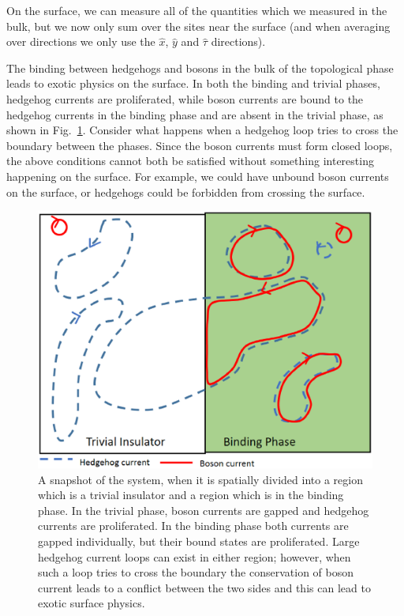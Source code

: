 \documentclass[prb,twocolumn]{revtex4-1}
\begin{document}
On the surface, we can measure all of the quantities which we measured in the bulk, but we now only sum over the sites near the surface (and when averaging over directions we only use the $\hat{x}$, $\hat{y}$ and $\hat{\tau}$ directions). 

The binding between hedgehogs and bosons in the bulk of the topological phase leads to exotic physics on the surface. In both the binding and trivial phases, hedgehog currents are proliferated, while boson currents are bound to the hedgehog currents in the binding phase and are absent in the trivial phase, as shown in Fig.~\ref{surface}. Consider what happens when a hedgehog loop tries to cross the boundary between the phases. Since the boson currents must form closed loops, the above conditions cannot both be satisfied without something interesting happening on the surface. For example, we could have unbound boson currents on the surface, or hedgehogs could be forbidden from crossing the surface.



\begin{figure}
\includegraphics[width=\linewidth]{figures/surface.eps}
\caption{A snapshot of the system, when it is spatially divided into a region which is a trivial insulator and a region which is in the binding phase. In the trivial phase, boson currents are gapped and hedgehog currents are proliferated. In the binding phase both currents are gapped individually, but their bound states are proliferated. Large hedgehog current loops can exist in either region; however, when such a loop tries to cross the boundary the conservation of boson current leads to a conflict between the two sides and this can lead to exotic surface physics. }
\label{surface}
\end{figure}
\end{document}

